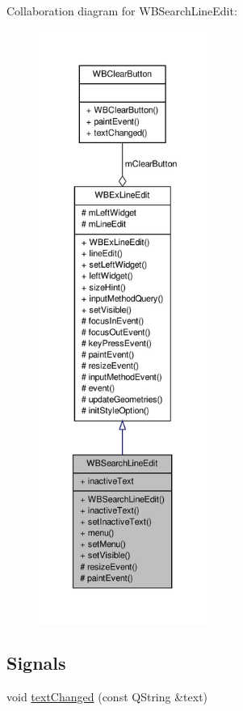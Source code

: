 Collaboration diagram for W\-B\-Search\-Line\-Edit\-:
\nopagebreak
\begin{figure}[H]
\begin{center}
\leavevmode
\includegraphics[height=550pt]{de/d92/class_w_b_search_line_edit__coll__graph}
\end{center}
\end{figure}
\subsection*{Signals}
\begin{DoxyCompactItemize}
\item 
void \hyperlink{class_w_b_search_line_edit_a665cc68b5a39c70d0f371e8f6d8887ff}{text\-Changed} (const Q\-String \&text)
\end{DoxyCompactItemize}
